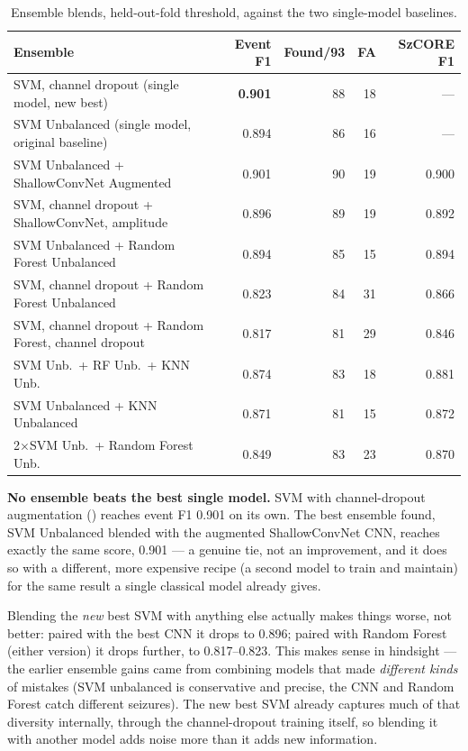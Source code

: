 \begin{table}[H]
  \centering
  \small
  \caption{Ensemble blends, held-out-fold threshold, against the two single-model baselines.}
  \label{tab:ensemble-results}
  \begin{tabular}{p{6.4cm}rrrr}
    \toprule
    Ensemble & Event F1 & Found/93 & FA & SzCORE F1 \\
    \midrule
    SVM, channel dropout (single model, new best) & \textbf{0.901} & 88 & 18 & --- \\
    SVM Unbalanced (single model, original baseline) & 0.894 & 86 & 16 & --- \\
    SVM Unbalanced + ShallowConvNet Augmented & 0.901 & 90 & 19 & 0.900 \\
    SVM, channel dropout + ShallowConvNet, amplitude & 0.896 & 89 & 19 & 0.892 \\
    SVM Unbalanced + Random Forest Unbalanced & 0.894 & 85 & 15 & 0.894 \\
    SVM, channel dropout + Random Forest Unbalanced & 0.823 & 84 & 31 & 0.866 \\
    SVM, channel dropout + Random Forest, channel dropout & 0.817 & 81 & 29 & 0.846 \\
    SVM Unb.\ + RF Unb.\ + KNN Unb. & 0.874 & 83 & 18 & 0.881 \\
    SVM Unbalanced + KNN Unbalanced & 0.871 & 81 & 15 & 0.872 \\
    2$\times$SVM Unb.\ + Random Forest Unb. & 0.849 & 83 & 23 & 0.870 \\
    \bottomrule
  \end{tabular}
\end{table}

\textbf{No ensemble beats the best single model.} SVM with channel-dropout augmentation
() reaches event F1 0.901 on its own. The best ensemble found, SVM
Unbalanced blended with the augmented ShallowConvNet CNN, reaches exactly the same score, 0.901
--- a genuine tie, not an improvement, and it does so with a different, more expensive recipe (a
second model to train and maintain) for the same result a single classical model already gives.

Blending the \emph{new} best SVM with anything else actually makes things worse, not better:
paired with the best CNN it drops to 0.896; paired with Random Forest (either version) it drops
further, to 0.817--0.823. This makes sense in hindsight --- the earlier ensemble gains came from
combining models that made \emph{different kinds} of mistakes (SVM unbalanced is conservative
and precise, the CNN and Random Forest catch different seizures). The new best SVM already
captures much of that diversity internally, through the channel-dropout training itself, so
blending it with another model adds noise more than it adds new information.

